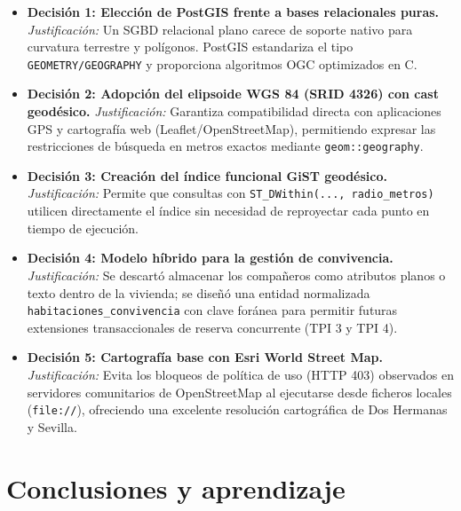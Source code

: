\documentclass[a4paper,12pt]{article}
\begin{document}
\begin{itemize}[leftmargin=1.0cm]
  \item \textbf{Decisión 1: Elección de PostGIS frente a bases relacionales puras.}  
  \textit{Justificación:} Un SGBD relacional plano carece de soporte nativo para curvatura terrestre y polígonos. PostGIS estandariza el tipo \texttt{GEOMETRY/GEOGRAPHY} y proporciona algoritmos OGC optimizados en C.
  
  \item \textbf{Decisión 2: Adopción del elipsoide WGS 84 (SRID 4326) con cast geodésico.}  
  \textit{Justificación:} Garantiza compatibilidad directa con aplicaciones GPS y cartografía web (Leaflet/OpenStreetMap), permitiendo expresar las restricciones de búsqueda en metros exactos mediante \texttt{geom::geography}.
  
  \item \textbf{Decisión 3: Creación del índice funcional GiST geodésico.}  
  \textit{Justificación:} Permite que consultas con \texttt{ST\_DWithin(..., radio\_metros)} utilicen directamente el índice sin necesidad de reproyectar cada punto en tiempo de ejecución.
  
  \item \textbf{Decisión 4: Modelo híbrido para la gestión de convivencia.}  
  \textit{Justificación:} Se descartó almacenar los compañeros como atributos planos o texto dentro de la vivienda; se diseñó una entidad normalizada \texttt{habitaciones\_convivencia} con clave foránea para permitir futuras extensiones transaccionales de reserva concurrente (TPI 3 y TPI 4).
  
  \item \textbf{Decisión 5: Cartografía base con Esri World Street Map.}  
  \textit{Justificación:} Evita los bloqueos de política de uso (HTTP 403) observados en servidores comunitarios de OpenStreetMap al ejecutarse desde ficheros locales (\texttt{file://}), ofreciendo una excelente resolución cartográfica de Dos Hermanas y Sevilla.
\end{itemize}

\section{Conclusiones y aprendizaje}
\end{document}
